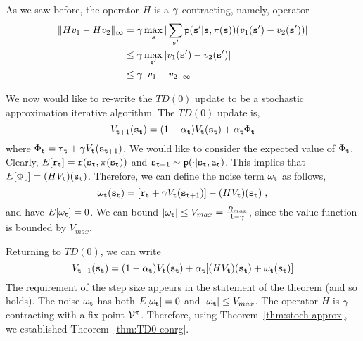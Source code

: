 As we saw before, the operator $H$ is a $\gamma$-contracting, namely,
operator
\begin{align*}
\|Hv_1-Hv_2\|_\infty &= \gamma \max_{s} |
\sum_{{\tt s}'}{\tt p}({\tt s}'|{\tt s},\pi({\tt s}))(v_1({\tt s}')-v_2({\tt s}'))|\\
&\leq \gamma\max_{{\tt s}'} |v_1({\tt s}')-v_2({\tt s}')|\\
&\leq \gamma \|v_1-v_2\|_\infty
\end{align*}

We now would like to re-write the $TD(0)$ update to be a stochastic
approximation iterative algorithm. The $TD(0)$ update is,
\[
V_{{\tt t}+1}({\tt s}_{\tt t})=(1-\alpha_{\tt t})V_{\tt t}({\tt s}_{\tt t})+\alpha_{\tt t}
\Phi_{\tt t}
\]
where $\Phi_{\tt t}={\tt r}_{\tt t}+\gamma
V_{\tt t}({\tt s}_{{\tt t}+1})$. We would like to consider the expected
value of $\Phi_{\tt t}$. Clearly,
$E[{\tt r}_{\tt t}]={\tt r}({\tt s}_{\tt t},\pi({\tt s}_{\tt t}))$
and ${\tt s}_{{\tt t}+1} \sim {\tt p}(\cdot |{\tt s}_{\tt t},{\tt a}_{\tt t})$.
This implies that $E[\Phi_{\tt t}]=(HV_{\tt t})({\tt s}_{\tt t})$.
Therefore, we can define the noise term $\omega_{\tt t}$ as follows,
\[
\omega_{\tt t}({\tt s}_{\tt t})=[{\tt r}_{\tt t}+\gamma
V_{\tt t}({\tt s}_{{\tt t}+1})]-(HV_{\tt t})({\tt s}_{\tt t})\;,
\]
and have $E[\omega_{\tt t}]=0$. We can bound $|\omega_{\tt t}|\leq
V_{max}=\frac{R_{max}}{1-\gamma}$, since the value function is
bounded by $V_{max}$.

Returning to $TD(0)$, we can write
\[
V_{{\tt t}+1}({\tt s}_{\tt t})=(1-\alpha_{\tt t})V_{\tt t}({\tt s}_{\tt t})+\alpha_{\tt t}
[(HV_{\tt t})({\tt s}_{\tt t})+\omega_{\tt t}({\tt s}_{\tt t})]
\]
The requirement of the step size appears in the statement of the
theorem (and so holds). The noise $\omega_{\tt t}$ has both
$E[\omega_{\tt t}]=0$ and $|\omega_{\tt t}|\leq V_{max}$. The
operator $H$ is $\gamma$-contracting with a fix-point $\mathcal{V}^\pi$.
Therefore, using Theorem~\ref{thm:stoch-approx}, we established
Theorem~\ref{thm:TD0-conrg}.

